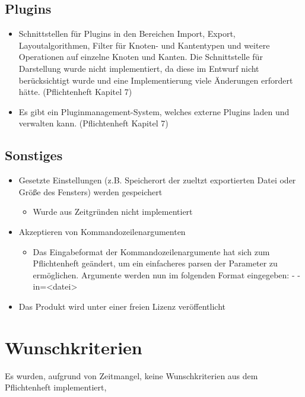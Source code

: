 \subsection{Plugins}
\begin{itemize}
	\item Schnittstellen für Plugins in den Bereichen Import, Export, Layoutalgorithmen, Filter für Knoten- und Kantentypen und weitere Operationen auf einzelne Knoten und Kanten. Die Schnittstelle für Darstellung wurde nicht implementiert, da diese im Entwurf nicht berücksichtigt wurde und eine Implementierung viele Änderungen erfordert hätte. (Pflichtenheft Kapitel 7)
	\item Es gibt ein Pluginmanagement-System, welches externe Plugins laden und verwalten kann. (Pflichtenheft Kapitel 7)
\end{itemize}

\subsection{Sonstiges}
\label{implkrit:sonstiges}
\begin{itemize}
	\item Gesetzte Einstellungen (z.B. Speicherort der zueltzt exportierten Datei oder Größe des Fensters) werden gespeichert
		\begin{itemize}
			\item Wurde aus Zeitgründen nicht implementiert
		\end{itemize}
	\item Akzeptieren von Kommandozeilenargumenten
		\begin{itemize}
			\item Das Eingabeformat der Kommandozeilenargumente hat sich zum Pflichtenheft geändert, um ein einfacheres parsen der Parameter zu  ermöglichen. Argumente werden nun im folgenden Format eingegeben: \glqq- -in=<datei>\grqq
		\end{itemize}
	\item Das Produkt wird unter einer freien Lizenz veröffentlicht	
\end{itemize}

\section{Wunschkriterien}
Es wurden, aufgrund von Zeitmangel, keine Wunschkriterien aus dem Pflichtenheft implementiert, 
